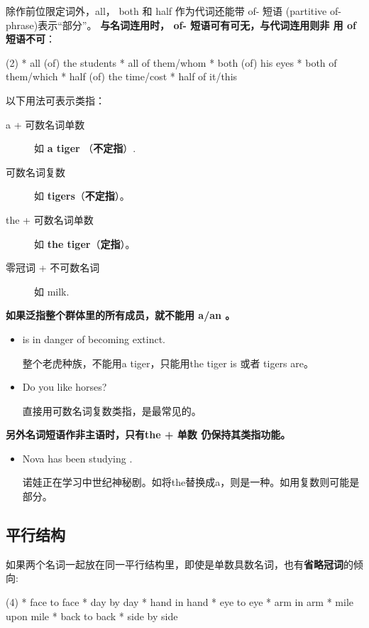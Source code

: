 除作前位限定词外，all， both 和 half 作为代词还能带 of- 短语 (partitive
of-phrase)表示“部分”。 \textbf{与名词连用时， of- 短语可有可无，与代词连用则非
  用 of短语不可}：
\begin{taskitem}(2)
  * all (of) the students
  * all of them/whom
  * both (of) his eyes
  * both of them/which
  * half (of) the time/cost
  * half of it/this
\end{taskitem}

以下用法可表示类指：
\begin{description}

\item[a + 可数名词单数] 如 \textbf{a tiger} （\textbf{不定指}）.
\item[可数名词复数] 如 \textbf{tigers}（\textbf{不定指}）。

\item[the + 可数名词单数] 如 \textbf{the tiger}（\textbf{定指}）。

\item[零冠词 + 不可数名词] 如 milk.
\end{description}

\textbf{如果泛指整个群体里的所有成员，就不能用 a/an 。}
\begin{itemize}
\item {} is in danger of becoming extinct.

  整个老虎种族，不能用a tiger，只能用the tiger is 或者 tigers are。

\item Do you like horses?

  直接用可数名词复数类指，是最常见的。
\end{itemize}

\textbf{另外名词短语作非主语时，只有the + 单数 仍保持其类指功能。}
\begin{itemize}
\item Nova has been studying .

  诺娃正在学习中世纪神秘剧。如将the替换成a，则是一种。如用复数则可能是部分。
\end{itemize}

\subsection{平行结构}

如果两个名词一起放在同一平行结构里，即使是单数具数名词，也有\textbf{省略冠词}的倾向:
\begin{taskitem}(4)
  * face to face
  * day by day
  * hand in hand
  * eye to eye
  * arm in arm
  * mile upon mile
  * back to back
  * side by side
\end{taskitem}

